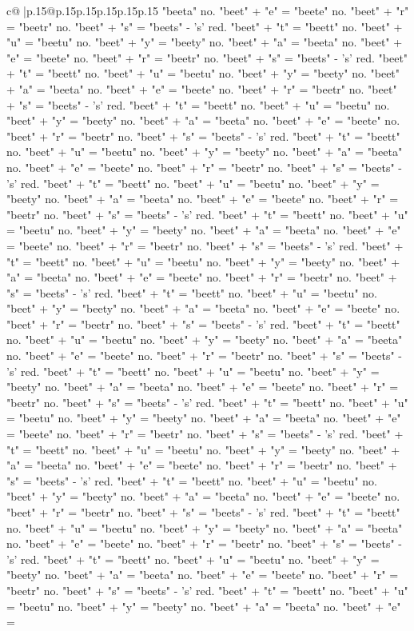 \documentclass{article}
\begin{document}
{\begin{supertabular}{c@{$\;$}|p{.15\linewidth}@{}p{.15\linewidth}p{.15\linewidth}p{.15\linewidth}p{.15\linewidth}p{.15\linewidth}}
{{{"beeta" no. "beet" + "e" = "beete" no. "beet" + "r" = "beetr" no. "beet" + "s" = "beets" {-} 's' red. "beet" + "t" = "beett" no. "beet" + "u" = "beetu" no. "beet" + "y" = "beety" no. "beet" + "a" = "beeta" no. "beet" + "e" = "beete" no. "beet" + "r" = "beetr" no. "beet" + "s" = "beets" {-} 's' red. "beet" + "t" = "beett" no. "beet" + "u" = "beetu" no. "beet" + "y" = "beety" no. "beet" + "a" = "beeta" no. "beet" + "e" = "beete" no. "beet" + "r" = "beetr" no. "beet" + "s" = "beets" {-} 's' red. "beet" + "t" = "beett" no. "beet" + "u" = "beetu" no. "beet" + "y" = "beety" no. "beet" + "a" = "beeta" no. "beet" + "e" = "beete" no. "beet" + "r" = "beetr" no. "beet" + "s" = "beets" {-} 's' red. "beet" + "t" = "beett" no. "beet" + "u" = "beetu" no. "beet" + "y" = "beety" no. "beet" + "a" = "beeta" no. "beet" + "e" = "beete" no. "beet" + "r" = "beetr" no. "beet" + "s" = "beets" {-} 's' red. "beet" + "t" = "beett" no. "beet" + "u" = "beetu" no. "beet" + "y" = "beety" no. "beet" + "a" = "beeta" no. "beet" + "e" = "beete" no. "beet" + "r" = "beetr" no. "beet" + "s" = "beets" {-} 's' red. "beet" + "t" = "beett" no. "beet" + "u" = "beetu" no. "beet" + "y" = "beety" no. "beet" + "a" = "beeta" no. "beet" + "e" = "beete" no. "beet" + "r" = "beetr" no. "beet" + "s" = "beets" {-} 's' red. "beet" + "t" = "beett" no. "beet" + "u" = "beetu" no. "beet" + "y" = "beety" no. "beet" + "a" = "beeta" no. "beet" + "e" = "beete" no. "beet" + "r" = "beetr" no. "beet" + "s" = "beets" {-} 's' red. "beet" + "t" = "beett" no. "beet" + "u" = "beetu" no. "beet" + "y" = "beety" no. "beet" + "a" = "beeta" no. "beet" + "e" = "beete" no. "beet" + "r" = "beetr" no. "beet" + "s" = "beets" {-} 's' red. "beet" + "t" = "beett" no. "beet" + "u" = "beetu" no. "beet" + "y" = "beety" no. "beet" + "a" = "beeta" no. "beet" + "e" = "beete" no. "beet" + "r" = "beetr" no. "beet" + "s" = "beets" {-} 's' red. "beet" + "t" = "beett" no. "beet" + "u" = "beetu" no. "beet" + "y" = "beety" no. "beet" + "a" = "beeta" no. "beet" + "e" = "beete" no. "beet" + "r" = "beetr" no. "beet" + "s" = "beets" {-} 's' red. "beet" + "t" = "beett" no. "beet" + "u" = "beetu" no. "beet" + "y" = "beety" no. "beet" + "a" = "beeta" no. "beet" + "e" = "beete" no. "beet" + "r" = "beetr" no. "beet" + "s" = "beets" {-} 's' red. "beet" + "t" = "beett" no. "beet" + "u" = "beetu" no. "beet" + "y" = "beety" no. "beet" + "a" = "beeta" no. "beet" + "e" = "beete" no. "beet" + "r" = "beetr" no. "beet" + "s" = "beets" {-} 's' red. "beet" + "t" = "beett" no. "beet" + "u" = "beetu" no. "beet" + "y" = "beety" no. "beet" + "a" = "beeta" no. "beet" + "e" = "beete" no. "beet" + "r" = "beetr" no. "beet" + "s" = "beets" {-} 's' red. "beet" + "t" = "beett" no. "beet" + "u" = "beetu" no. "beet" + "y" = "beety" no. "beet" + "a" = "beeta" no. "beet" + "e" = "beete" no. "beet" + "r" = "beetr" no. "beet" + "s" = "beets" {-} 's' red. "beet" + "t" = "beett" no. "beet" + "u" = "beetu" no. "beet" + "y" = "beety" no. "beet" + "a" = "beeta" no. "beet" + "e" = "beete" no. "beet" + "r" = "beetr" no. "beet" + "s" = "beets" {-} 's' red. "beet" + "t" = "beett" no. "beet" + "u" = "beetu" no. "beet" + "y" = "beety" no. "beet" + "a" = "beeta" no. "beet" + "e" = }}}
\end{supertabular}}
\end{document}
